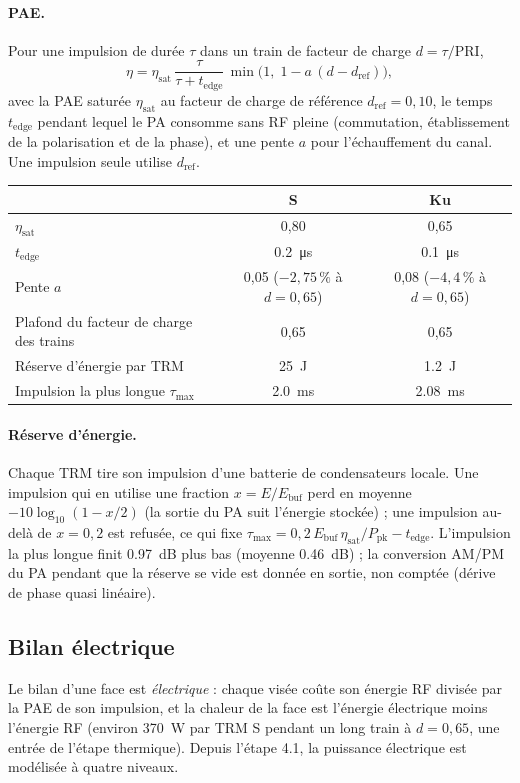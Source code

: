 \documentclass[11pt,a4paper]{article}
\begin{document}
\paragraph{PAE.} Pour une impulsion de durée $\tau$ dans un train de facteur de charge $d = \tau/\mathrm{PRI}$,
\[
  \eta = \eta_{\mathrm{sat}}\,\frac{\tau}{\tau + t_{\mathrm{edge}}}\,\min\bigl(1,\;1 - a\,(d - d_{\mathrm{ref}})\bigr),
\]
avec la PAE saturée $\eta_{\mathrm{sat}}$ au facteur de charge de référence $d_{\mathrm{ref}} = 0,10$, le temps
$t_{\mathrm{edge}}$ pendant lequel le PA consomme sans RF pleine (commutation, établissement de la polarisation et de
la phase), et une pente $a$ pour l'échauffement du canal. Une impulsion seule utilise $d_{\mathrm{ref}}$.

\begin{center}
\begin{tabular}{@{}lcc@{}}
\toprule
 & S & Ku\\
\midrule
$\eta_{\mathrm{sat}}$ & 0,80 & 0,65\\
$t_{\mathrm{edge}}$ & \SI{0.2}{\micro s} & \SI{0.1}{\micro s}\\
Pente $a$ & 0,05 ($-2,75\,\%$ à $d=0,65$) & 0,08 ($-4,4\,\%$ à $d=0,65$)\\
Plafond du facteur de charge des trains & 0,65 & 0,65\\
Réserve d'énergie par TRM & \SI{25}{J} & \SI{1.2}{J}\\
Impulsion la plus longue $\tau_{\max}$ & \SI{2.0}{ms} & \SI{2.08}{ms}\\
\bottomrule
\end{tabular}
\end{center}

\paragraph{Réserve d'énergie.} Chaque TRM tire son impulsion d'une batterie de condensateurs locale. Une impulsion qui
en utilise une fraction $x = E/E_{\mathrm{buf}}$ perd en moyenne $-10\log_{10}(1-x/2)$ (la sortie du PA suit l'énergie
stockée) ; une impulsion au-delà de $x = 0,2$ est refusée, ce qui fixe
$\tau_{\max} = 0,2\,E_{\mathrm{buf}}\,\eta_{\mathrm{sat}}/P_{\mathrm{pk}} - t_{\mathrm{edge}}$. L'impulsion la plus longue
finit \SI{0.97}{dB} plus bas (moyenne \SI{0.46}{dB}) ; la conversion AM/PM du PA pendant que la réserve se vide est
donnée en sortie, non comptée (dérive de phase quasi linéaire).

\subsection{Bilan électrique}\label{sec:power}
Le bilan d'une face est \emph{électrique} : chaque visée coûte son énergie RF divisée par la PAE de son impulsion, et
la chaleur de la face est l'énergie électrique moins l'énergie RF (environ \SI{370}{W} par TRM S pendant un long train
à $d = 0,65$, une entrée de l'étape thermique). Depuis l'étape 4.1, la puissance électrique est modélisée à quatre
niveaux.
\end{document}
